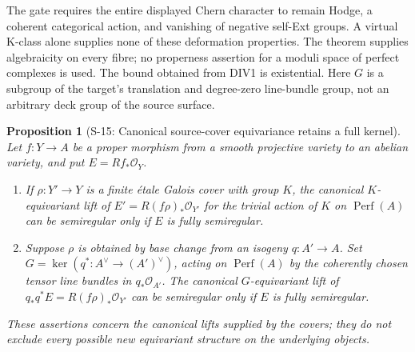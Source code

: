 \documentclass[11pt,a4paper]{article}
\newtheorem{proposition}[theorem]{Proposition}
\theoremstyle{definition}
\begin{document}
The gate requires the entire displayed Chern character to remain
Hodge, a coherent categorical action, and vanishing of negative
self-Ext groups. A virtual K-class alone supplies none of these
deformation properties. The theorem supplies algebraicity on
every fibre; no properness assertion for a moduli space of
perfect complexes is used. The bound obtained from DIV1 is
existential. Here $G$ is a subgroup of the target's translation
and degree-zero line-bundle group, not an arbitrary deck group
of the source surface.

\begin{proposition}[S-15: Canonical source-cover equivariance retains a full kernel]
\label{prop:semireg-cover-equivariance}
Let $f:Y\to A$ be a proper morphism from a smooth projective
variety to an abelian variety, and put $E=Rf_*\mathcal O_Y$.
\begin{enumerate}
\item If $\rho:Y'\to Y$ is a finite \'etale Galois cover with
group $K$, the canonical $K$-equivariant lift of
$E'=R(f\rho)_*\mathcal O_{Y'}$ for the trivial action of $K$
on $\operatorname{Perf}(A)$ can be semiregular only if $E$
is fully semiregular.
\item Suppose $\rho$ is obtained by base change from an isogeny
$q:A'\to A$. Set
$G=\ker(q^*:A^\vee\to(A')^\vee)$, acting on
$\operatorname{Perf}(A)$ by the coherently chosen tensor
line bundles in $q_*\mathcal O_{A'}$.
The canonical $G$-equivariant lift of
$q_*q^*E=R(f\rho)_*\mathcal O_{Y'}$ can be semiregular only if
$E$ is fully semiregular.
\end{enumerate}
These assertions concern the canonical lifts supplied by the
covers; they do not exclude every possible new equivariant
structure on the underlying objects.
\end{proposition}
\end{document}
